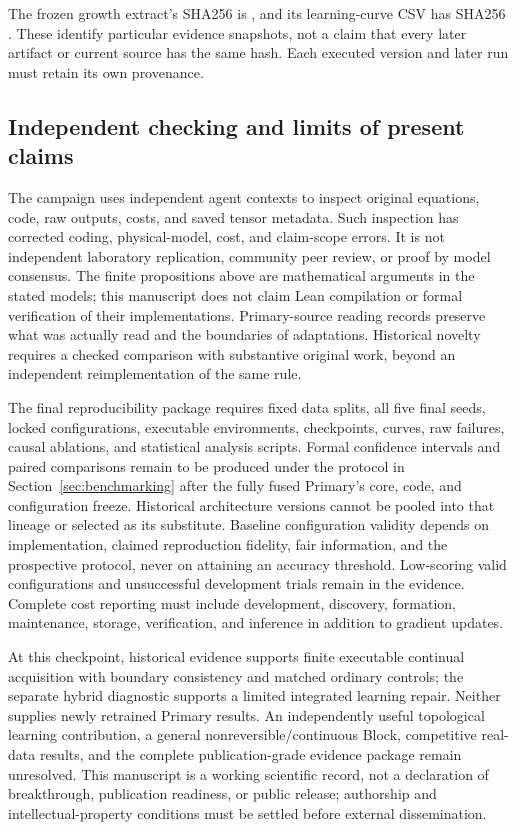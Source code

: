 The frozen growth extract's SHA256 is
,
and its learning-curve CSV has SHA256
.
These identify particular evidence snapshots, not a claim that every later
artifact or current source has the same hash. Each executed version and later
run must retain its own provenance.

\subsection{Independent checking and limits of present claims}

The campaign uses independent agent contexts to inspect original equations,
code, raw outputs, costs, and saved tensor metadata. Such inspection has
corrected coding, physical-model, cost, and claim-scope errors. It is not
independent laboratory replication, community peer review, or proof by model
consensus. The finite propositions above are mathematical arguments in the
stated models; this manuscript does not claim Lean compilation or formal
verification of their implementations. Primary-source reading records preserve
what was actually read and the boundaries of adaptations. Historical novelty
requires a checked comparison with substantive original work, beyond an
independent reimplementation of the same rule.

The final reproducibility package requires fixed data splits, all five final
seeds, locked configurations, executable environments, checkpoints, curves,
raw failures, causal ablations, and statistical analysis scripts. Formal
confidence intervals and paired comparisons remain to be produced under the
protocol in Section~\ref{sec:benchmarking} after the fully fused Primary's core,
code, and configuration freeze. Historical architecture versions cannot be
pooled into that lineage or selected as its substitute. Baseline configuration
validity depends on implementation, claimed reproduction fidelity, fair
information, and the prospective protocol, never on attaining an accuracy
threshold. Low-scoring valid configurations and unsuccessful development
trials remain in the evidence. Complete cost reporting must include
development, discovery, formation, maintenance, storage, verification, and
inference in addition to gradient updates.

At this checkpoint, historical evidence supports finite executable continual
acquisition with boundary consistency and matched ordinary controls; the
separate hybrid diagnostic supports a limited integrated learning repair.
Neither supplies newly retrained Primary results. An independently useful
topological learning contribution, a general
nonreversible/continuous Block, competitive real-data results, and the complete
publication-grade evidence package remain unresolved. This manuscript is a
working scientific record, not a declaration of breakthrough, publication
readiness, or public release; authorship and intellectual-property conditions
must be settled before external dissemination.


